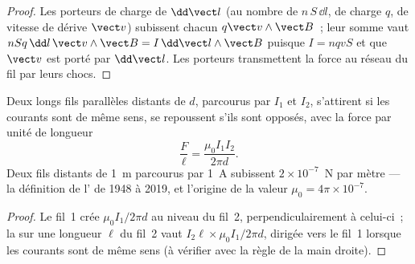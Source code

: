 \begin{proof}
Les porteurs de charge de $\dd\vect l$ (au nombre de $n\,S\,\dd l$, de charge
$q$, de vitesse de dérive $\vect v$) subissent chacun $q\vect v\wedge\vect B$~;
leur somme vaut
$nSq\,\dd l\,\vect v\wedge\vect B = I\,\dd\vect l\wedge\vect B$ puisque $I = nqvS$
et que $\vect v$ est porté par $\dd\vect l$. Les porteurs transmettent la force
au réseau du fil par leurs chocs.
\end{proof}

\begin{proposition}\label{prop:b1:magnetostatics:parallel}
Deux longs fils parallèles distants de $d$, parcourus par $I_1$ et $I_2$,
s'attirent si les courants sont de même sens, se repoussent s'ils sont
opposés, avec la force par unité de longueur
\[
\frac{F}{\ell} = \frac{\mu_0I_1I_2}{2\pi d} .
\]
Deux fils distants de \qty{1}{m} parcourus par \qty{1}{A} subissent $2 \times 10^{-7}$~N par
mètre --- la définition de l' de 1948 à 2019, et l'origine de la valeur
$\mu_0 = 4\pi \times 10^{-7}$.
\end{proposition}

\begin{proof}
Le fil~1 crée $\mu_0I_1/2\pi d$ au niveau du fil~2, perpendiculairement à
celui-ci~; la  sur une longueur $\ell$ du fil~2 vaut $I_2\ell \times \mu_0I_1/2\pi d$,
dirigée vers le fil~1 lorsque les courants sont de même sens (à vérifier avec
la règle de la main droite).
\end{proof}

